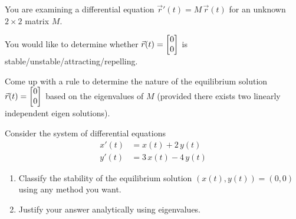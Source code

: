\documentclass{workbook}
\begin{document}
\begin{slide}
	\question
	You are examining a differential equation $\vec r'(t) = M\, \vec r(t)$ for an unknown $2\times 2$ matrix $M$.

	 You would like to determine whether $\vec r(t)=\mat{0\\0}$ is stable/unstable/attracting/repelling.
	\begin{parts}
		\item Come up with a rule to determine the nature of the equilibrium solution $\vec r(t) =\mat{0\\0}$ based on the eigenvalues of $M$ (provided there exists two linearly independent eigen solutions).
		\item Consider the system of differential equations
		\begin{align*}
			x'(t) &= x(t)+2\,y(t)\\
			y'(t) &= 3\, x(t)-4\,y(t)
		\end{align*}
		\begin{enumerate}
			\item Classify the stability of the equilibrium solution $(x(t), y(t))=(0,0)$ using any method you want.
			\item Justify your answer analytically using eigenvalues.
		\end{enumerate}
	\end{parts}
\end{slide}

%
%
\end{document}
